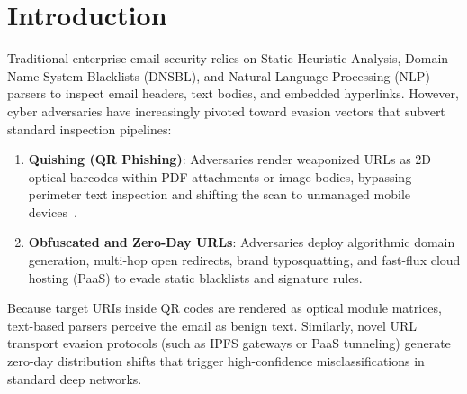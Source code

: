 \documentclass[conference]{IEEEtran}
\begin{document}
\section{Introduction}
Traditional enterprise email security relies on Static Heuristic Analysis, Domain Name System Blacklists (DNSBL), and Natural Language Processing (NLP) parsers to inspect email headers, text bodies, and embedded hyperlinks. However, cyber adversaries have increasingly pivoted toward evasion vectors that subvert standard inspection pipelines:
\begin{enumerate}
    \item \textbf{Quishing (QR Phishing)}: Adversaries render weaponized URLs as 2D optical barcodes within PDF attachments or image bodies, bypassing perimeter text inspection and shifting the scan to unmanaged mobile devices~\cite{fbi2024}.
    \item \textbf{Obfuscated and Zero-Day URLs}: Adversaries deploy algorithmic domain generation, multi-hop open redirects, brand typosquatting, and fast-flux cloud hosting (PaaS) to evade static blacklists and signature rules.
\end{enumerate}

Because target URIs inside QR codes are rendered as optical module matrices, text-based parsers perceive the email as benign text. Similarly, novel URL transport evasion protocols (such as IPFS gateways or PaaS tunneling) generate zero-day distribution shifts that trigger high-confidence misclassifications in standard deep networks.
\end{document}
